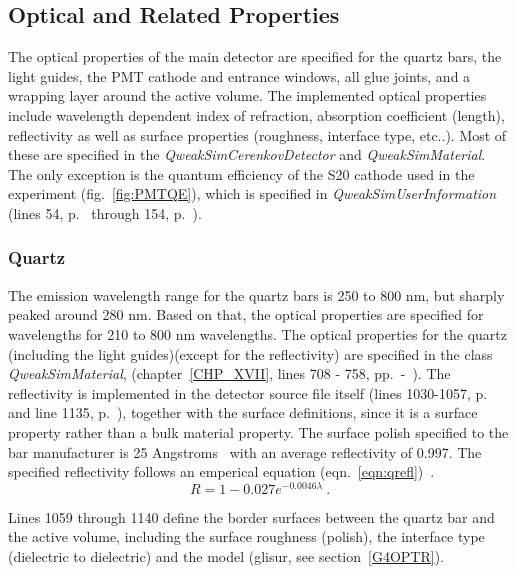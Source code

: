 \subsection{Optical and Related Properties}

The optical properties of the main detector are specified for the
quartz bars, the light guides, the PMT cathode and entrance windows,
all glue joints, and a wrapping layer around the active volume.  The
implemented optical properties include wavelength dependent index of
refraction, absorption coefficient (length), reflectivity as well as
surface properties (roughness, interface type, etc..). Most of these
are specified in the {\it QweakSimCerenkovDetector} and {\it
QweakSimMaterial}. The only exception is the quantum efficiency of the
S20 cathode used in the experiment (fig.~\ref{fig:PMTQE}), which is
specified in {\it QweakSimUserInformation} (lines 54,
p.~\pageref{SourceXVIII3} through 154, p.~\pageref{SourceXVIII5}).

\subsubsection{Quartz}

The emission wavelength range for the quartz bars is 250 to 800 nm,
but sharply peaked around 280 nm. Based on that, the optical
properties are specified for wavelengths for 210 to 800 nm
wavelengths.  The optical properties for the quartz (including the
light guides)(except for the reflectivity) are specified in the class
{\it QweakSimMaterial}, (chapter~\ref{CHP_XVII}, lines 708 - 758,
pp.~\pageref{SourceXVII12}-~\pageref{SourceXVII13}).  The reflectivity
is implemented in the detector source file itself (lines 1030-1057,
p.~\pageref{SourceV17} and line 1135, p.~\pageref{SourceV18}),
together with the surface definitions, since it is a surface property
rather than a bulk material property.  The surface polish specified to
the bar manufacturer is 25 Angstroms~\cite{tn:MACK1} with an average
reflectivity of 0.997. The specified reflectivity follows an emperical
equation (eqn.~\ref{eqn:qrefl})~\cite{tn:NEVEN}.
\begin{equation}
  R = 1-0.027e^{-0.0046\lambda}~.\label{eqn:qrefl}
\end{equation}

Lines 1059 through 1140 define the border surfaces between the quartz
bar and the active volume, including the surface roughness (polish),
the interface type (dielectric to dielectric) and the model (glisur,
see section~\ref{G4OPTR}).

